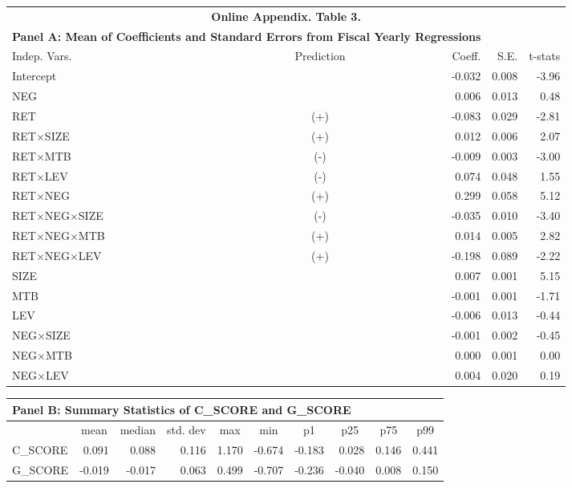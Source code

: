 \begin{table}[htbp] \label{oat3}
  \centering
    \begin{tabular}{lcrrr}
    \multicolumn{5}{c}{\textbf{Online Appendix. Table 3.}} \\
    \multicolumn{3}{c}{\textbf{Panel A: Mean of Coefficients and Standard Errors from Fiscal Yearly Regressions}} &&\\
    \midrule
    \midrule
    Indep. Vars. & Prediction & Coeff. & S.E. & t-stats \\
    \midrule
    Intercept &   & -0.032 & 0.008 & -3.96 \\
    NEG &   & 0.006 & 0.013 & 0.48 \\
    RET & (+) & -0.083 & 0.029 & -2.81 \\
    RET$\times$SIZE & (+) & 0.012 & 0.006 & 2.07 \\
    RET$\times$MTB & (-) & -0.009 & 0.003 & -3.00 \\
    RET$\times$LEV & (-) & 0.074 & 0.048 & 1.55 \\
    RET$\times$NEG & (+) & 0.299 & 0.058 & 5.12 \\
    RET$\times$NEG$\times$SIZE & (-) & -0.035 & 0.010 & -3.40 \\
    RET$\times$NEG$\times$MTB & (+) & 0.014 & 0.005 & 2.82 \\
    RET$\times$NEG$\times$LEV & (+) & -0.198 & 0.089 & -2.22 \\
    SIZE &   & 0.007 & 0.001 & 5.15 \\
    MTB &   & -0.001 & 0.001 & -1.71 \\
    LEV &   & -0.006 & 0.013 & -0.44 \\
    NEG$\times$SIZE &   & -0.001 & 0.002 & -0.45 \\
    NEG$\times$MTB &   & 0.000 & 0.001 & 0.00 \\
    NEG$\times$LEV &   & 0.004 & 0.020 & 0.19 \\
    \bottomrule
    \bottomrule
    \end{tabular}%
\end{table}%

\begin{table}[htbp]
	\centering
	\begin{tabular}{lrrrrrrrrr}
		\multicolumn{10}{l}{\textbf{Panel B: Summary Statistics of C\_SCORE and G\_SCORE}}  \\
		\midrule
		\midrule
		& \multicolumn{1}{c}{mean} & \multicolumn{1}{c}{median} & \multicolumn{1}{c}{std. dev} & \multicolumn{1}{c}{max} & \multicolumn{1}{c}{min} & \multicolumn{1}{c}{p1} & \multicolumn{1}{c}{p25} & \multicolumn{1}{c}{p75} & \multicolumn{1}{c}{p99} \\
		\midrule
		C\_SCORE & 0.091 & 0.088 & 0.116 & 1.170 & -0.674 & -0.183 & 0.028 & 0.146 & 0.441 \\
		G\_SCORE & -0.019 & -0.017 & 0.063 & 0.499 & -0.707 & -0.236 & -0.040 & 0.008 & 0.150 \\
		\bottomrule
		\bottomrule
	\end{tabular}%
\end{table}%
